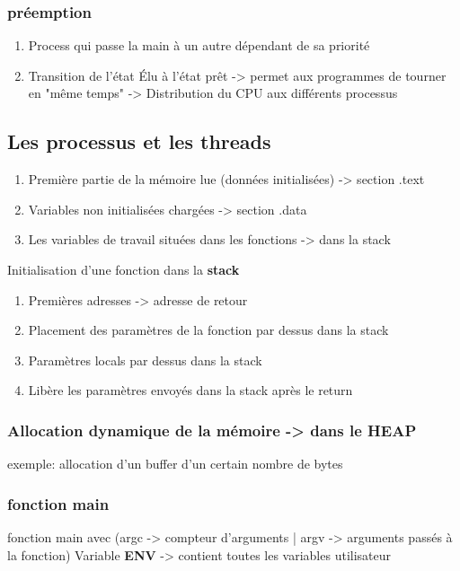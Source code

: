 \subsubsection{préemption}
\begin{enumerate}
\item Process qui passe la main à un autre dépendant de sa priorité
\item Transition de l'état Élu à l'état prêt -> permet aux programmes de tourner en "même temps" -> Distribution du CPU aux différents processus 
\end{enumerate}

\subsection{Les processus et les threads}
\begin{enumerate}
\item Première partie de la mémoire lue (données initialisées) -> section .text
\item Variables non initialisées chargées -> section .data
\item Les variables de travail situées dans les fonctions -> dans la stack
\end{enumerate}
Initialisation d'une fonction dans la \textbf{stack}
\begin{enumerate}
\item Premières adresses -> adresse de retour
\item Placement des paramètres de la fonction par dessus dans la stack
\item Paramètres locals par dessus dans la stack
\item Libère les paramètres envoyés dans la stack après le return
\end{enumerate}

\subsubsection{Allocation dynamique de la mémoire -> dans le \textbf{HEAP}}
exemple: allocation d'un buffer d'un certain nombre de bytes

\subsubsection{fonction main}
fonction main avec (argc -> compteur d'arguments | argv -> arguments passés à la fonction)
Variable \textbf{ENV} -> contient toutes les variables utilisateur

